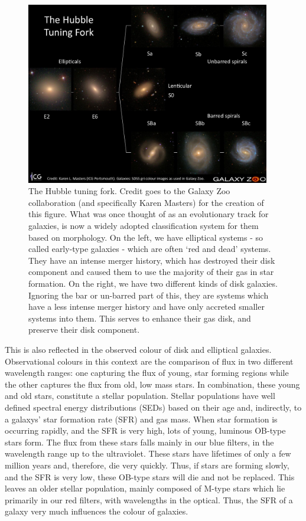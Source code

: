 \begin{figure}
    \centering
    \includegraphics[width=0.95\textwidth]{Introduction/figures/hubble-tuning-fork.jpg}
    \caption{The Hubble tuning fork. Credit goes to the Galaxy Zoo collaboration (and specifically Karen Masters) for the creation of this figure. What was once thought of as an evolutionary track for galaxies, is now a widely adopted classification system for them based on morphology. On the left, we have elliptical systems - so called early-type galaxies - which are often `red and dead' systems. They have an intense merger history, which has destroyed their disk component and caused them to use the majority of their gas in star formation. On the right, we have two different kinds of disk galaxies. Ignoring the bar or un-barred part of this, they are systems which have a less intense merger history and have only accreted smaller systems into them. This serves to enhance their gas disk, and preserve their disk component.}
    \label{fig:hubble-tuning}
\end{figure}

This is also reflected in the observed colour of disk and elliptical galaxies. Observational colours in this context are the comparison of flux in two different wavelength ranges: one capturing the flux of young, star forming regions while the other captures the flux from old, low mass stars. In combination, these young and old stars, constitute a stellar population. Stellar populations have well defined spectral energy distributions (SEDs) based on their age and, indirectly, to a galaxys' star formation rate (SFR) and gas mass. When star formation is occurring rapidly, and the SFR is very high, lots of young, luminous OB-type stars form. The flux from these stars falls mainly in our blue filters, in the wavelength range up to the ultraviolet. These stars have lifetimes of only a few million years \citep{Papers on young OB type stars} and, therefore, die very quickly. Thus, if stars are forming slowly, and the SFR is very low, these OB-type stars will die and not be replaced. This leaves an older stellar population, mainly composed of M-type stars which lie primarily in our red filters, with wavelengths in the optical. Thus, the SFR of a galaxy very much influences the colour of galaxies.

